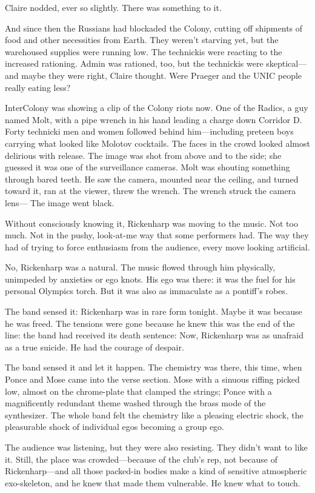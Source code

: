 Claire nodded, ever so slightly. There was something to it.

And since then the Russians had blockaded the Colony, cutting off shipments of food and other necessities from Earth. They weren’t starving yet, but the warehoused supplies were running low. The technickis were reacting to the increased rationing. Admin was rationed, too, but the technickis were skeptical—and maybe they were right, Claire thought. Were Praeger and the UNIC people really eating less?

InterColony was showing a clip of the Colony riots now. One of the Radics, a guy named Molt, with a pipe wrench in his hand leading a charge down Corridor D. Forty technicki men and women followed behind him—including preteen boys carrying what looked like Molotov cocktails. The faces in the crowd looked almost delirious with release. The image was shot from above and to the side; she guessed it was one of the surveillance cameras. Molt was shouting something through bared teeth. He saw the camera, mounted near the ceiling, and turned toward it, ran at the viewer, threw the wrench. The wrench struck the camera lens— The image went black.

Without consciously knowing it, Rickenharp was moving to the music. Not too much. Not in the pushy, look-at-me way that some performers had. The way they had of trying to force enthusiasm from the audience, every move looking artificial.

No, Rickenharp was a natural. The music flowed through him physically, unimpeded by anxieties or ego knots. His ego was there: it was the fuel for his personal Olympics torch. But it was also as immaculate as a pontiff’s robes.

The band sensed it: Rickenharp was in rare form tonight. Maybe it was because he was freed. The tensions were gone because he knew this was the end of the line: the band had received its death sentence: Now, Rickenharp was as unafraid as a true suicide. He had the courage of despair.

The band sensed it and let it happen. The chemistry was there, this time, when Ponce and Mose came into the verse section. Mose with a sinuous riffing picked low, almost on the chrome-plate that clamped the strings; Ponce with a magnificently redundant theme washed through the brass mode of the synthesizer. The whole band felt the chemistry like a pleasing electric shock, the pleasurable shock of individual egos becoming a group ego.

The audience was listening, but they were also resisting. They didn’t want to like it. Still, the place was crowded—because of the club’s rep, not because of Rickenharp—and all those packed-in bodies make a kind of sensitive atmospheric exo-skeleton, and he knew that made them vulnerable. He knew what to touch.

